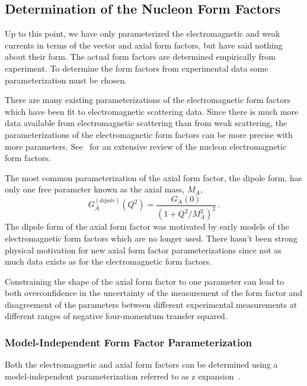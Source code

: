 \subsection{Determination of the Nucleon Form Factors} \label{sec:formfactorforms}

  Up to this point, we have only parameterized the electromagnetic and weak
  currents in terms of the vector and axial form factors, but have said nothing
  about their form. The actual form factors are determined empirically from
  experiment. To determine the form factors from experimental data some
  parameterization must be chosen.

  There are many existing parameterizations of the electromagnetic form factors
  which have been fit to electromagnetic scattering data. Since there is much
  more data available from electromagnetic scattering than from weak
  scattering, the parameterizations of the electromagnetic form factors can be
  more precise with more parameters.
  See~\cite{Perdrisat:2006hj} for an extensive review of
  the nucleon electromagnetic form factors.
  
  The most common parameterization of the axial form factor, the dipole form,
  has only one free parameter known as the axial mass, $M_A$,
  \begin{equation}
    G_A^{(dipole)}(Q^2) = \frac{G_A(0)}{(1+Q^2/M_A^2)^2} \,.
  \end{equation}
  The dipole form of the axial form factor was motivated by early models of the
  electromagnetic form factors which are no longer used. There hasn't been
  strong physical motivation for new axial form factor parameterizations since
  not as much data exists as for the electromagnetic form factors.

  Constraining the shape of the axial form factor to one parameter can lead to
  both overconfidence in the uncertainty of the measurement of the form factor
  and disagreement of the parameters between different experimental
  measurements at different ranges of negative four-momentum transfer squared.

  \subsubsection{Model-Independent Form Factor Parameterization}\label{sec:zexpansion}

  Both the electromagnetic and axial form factors can be determined using a
  model-independent parameterization referred to as z
  expansion~\cite{Boyd:1997qw}.

